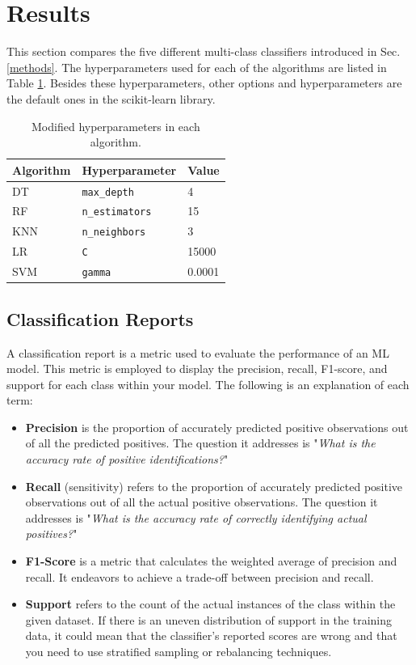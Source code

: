 \documentclass[conference]{IEEEtran}
\begin{document}
\section{Results} \label{results}
This section compares the five different multi-class classifiers introduced in Sec. \ref{methods}. The hyperparameters used for each of the algorithms are listed in Table \ref{tab:hyperparameters}. Besides these hyperparameters, other options and hyperparameters are the default ones in the scikit-learn library.


\begin{table}
    \caption{Modified hyperparameters in each algorithm.}
    \centering
    \begin{tabular}{l|l|l}
        Algorithm & Hyperparameter & Value\\
        \hline
        DT & \texttt{\small max\_depth} & 4\\
        RF & \texttt{\small n\_estimators} & 15\\
        KNN & \texttt{\small n\_neighbors} & 3\\
        LR & \texttt{\small C} & 15000\\
        SVM & \texttt{\small gamma} & 0.0001\\
    \end{tabular}
    \label{tab:hyperparameters}
    \vspace{-5mm}
\end{table}

\subsection{Classification Reports}
A classification report is a metric used to evaluate the performance of an ML model. This metric is employed to display the precision, recall, F1-score, and support for each class within your model. The following is an explanation of each term:
\begin{itemize}
    \item \textbf{Precision} is the proportion of accurately predicted positive observations out of all the predicted positives. The question it addresses is "\textit{What is the accuracy rate of positive identifications?}"
    \item \textbf{Recall} (sensitivity) refers to the proportion of accurately predicted positive observations out of all the actual positive observations. The question it addresses is "\textit{What is the accuracy rate of correctly identifying actual positives?}"
    \item \textbf{F1-Score} is a metric that calculates the weighted average of precision and recall. It endeavors to achieve a trade-off between precision and recall.
    \item \textbf{Support} refers to the count of the actual instances of the class within the given dataset. If there is an uneven distribution of support in the training data, it could mean that the classifier's reported scores are wrong and that you need to use stratified sampling or rebalancing techniques.
\end{itemize}
\end{document}
